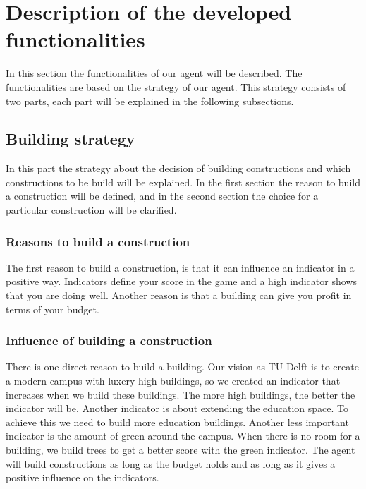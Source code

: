 \section{Description of the developed functionalities}
In this section the functionalities of our agent will be described. The functionalities are based on the strategy of our agent. This strategy consists of two parts, each part will be explained in the following subsections.

\subsection{Building strategy}
In this part the strategy about the decision of building constructions and which constructions to be build will be explained. In the first section the reason to build a construction will be defined, and in the second section the choice for a particular construction will be clarified. 

\subsubsection{Reasons to build a construction}
The first reason to build a construction, is that it can influence an indicator in a positive way. Indicators define your score in the game and a high indicator shows that you are doing well. Another reason is that a building can give you profit in terms of your budget.

\subsubsection{Influence of building a construction}
There is one direct reason to build a building. Our vision as TU Delft is to create a modern campus with luxery high buildings, so we created an indicator that increases when we build these buildings. The more high buildings, the better the indicator will be. Another indicator is about extending the education space. To achieve this we need to build more education buildings. Another less important indicator is the amount of green around the campus. When there is no room for a building, we build trees to get a better score with the green indicator. The agent will build constructions as long as the budget holds and as long as it gives a positive influence on the indicators.

